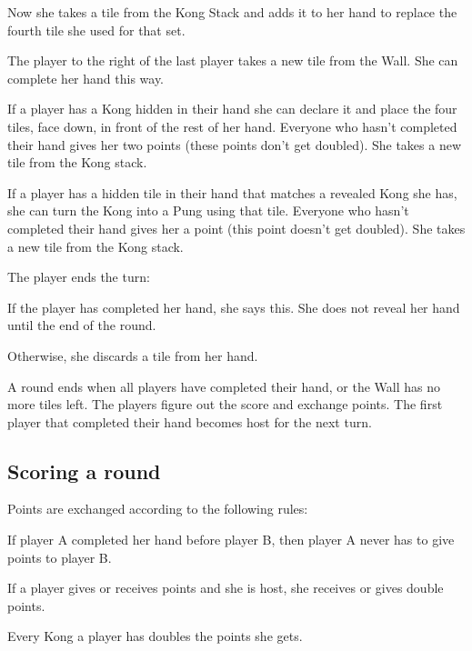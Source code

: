 \documentclass{article}
\begin{document}
\begin{enumerate*}
\begin{enumerate*}
        Now she takes a tile from the Kong Stack and adds it to her hand to replace the fourth tile she used for that set.
        \item The player to the right of the last player takes a new tile from the Wall. She can complete her hand this way.
    \end{enumerate*}
    \item If a player has a Kong hidden in their hand she can declare it and place the four tiles, face down, in front of the rest of her hand.
    Everyone who hasn't completed their hand gives her two points (these points don't get doubled).
    She takes a new tile from the Kong stack.
    \item If a player has a hidden tile in their hand that matches a revealed Kong she has, she can turn the Kong into a Pung using that tile.
    Everyone who hasn't completed their hand gives her a point (this point doesn't get doubled).
    She takes a new tile from the Kong stack.
    \item The player ends the turn:
        \begin{enumerate*}
            \item If the player has completed her hand, she says this. She does not reveal her hand until the end of the round.
            \item Otherwise, she discards a tile from her hand.
        \end{enumerate*}
\end{enumerate*}

A round ends when all players have completed their hand, or the Wall has no more tiles left. The players figure out the score and exchange points. The first player that completed their hand becomes host for the next turn.

\subsection{Scoring a round}
Points are exchanged according to the following rules:
\begin{itemize*}
    \item If player A completed her hand before player B, then player A never has to give points to player B.
    \item If a player gives or receives points and she is host, she receives or gives double points.
    \item Every Kong a player has doubles the points she gets.

\end{itemize*}

\end{document}
